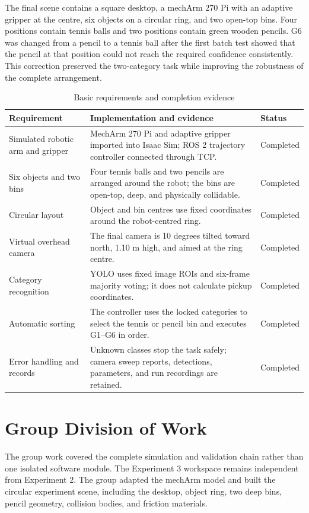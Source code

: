 \documentclass[12pt,a4paper]{article}
\begin{document}
The final scene contains a square desktop, a mechArm 270 Pi with an adaptive gripper at the centre, six objects on a circular ring, and two open-top bins. Four positions contain tennis balls and two positions contain green wooden pencils. G6 was changed from a pencil to a tennis ball after the first batch test showed that the pencil at that position could not reach the required confidence consistently. This correction preserved the two-category task while improving the robustness of the complete arrangement.

\begin{table}[H]
\centering
\caption{Basic requirements and completion evidence}
\begin{tabularx}{\textwidth}{p{4.0cm}Y p{2.2cm}}
\toprule
Requirement & Implementation and evidence & Status\\
\midrule
Simulated robotic arm and gripper & MechArm 270 Pi and adaptive gripper imported into Isaac Sim; ROS 2 trajectory controller connected through TCP. & Completed\\
Six objects and two bins & Four tennis balls and two pencils are arranged around the robot; the bins are open-top, deep, and physically collidable. & Completed\\
Circular layout & Object and bin centres use fixed coordinates around the robot-centred ring. & Completed\\
Virtual overhead camera & The final camera is 10 degrees tilted toward north, 1.10 m high, and aimed at the ring centre. & Completed\\
Category recognition & YOLO uses fixed image ROIs and six-frame majority voting; it does not calculate pickup coordinates. & Completed\\
Automatic sorting & The controller uses the locked categories to select the tennis or pencil bin and executes G1--G6 in order. & Completed\\
Error handling and records & Unknown classes stop the task safely; camera sweep reports, detections, parameters, and run recordings are retained. & Completed\\
\bottomrule
\end{tabularx}
\end{table}

\section{Group Division of Work}

The group work covered the complete simulation and validation chain rather than one isolated software module. The Experiment 3 workspace remains independent from Experiment 2. The group adapted the mechArm model and built the circular experiment scene, including the desktop, object ring, two deep bins, pencil geometry, collision bodies, and friction materials.
\end{document}
